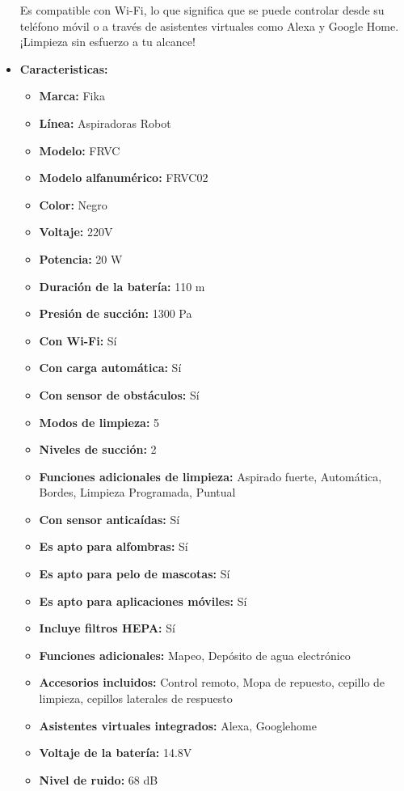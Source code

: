 \documentclass{article}
\begin{document}
\begin{adjustwidth}{2em}{}
\begin{itemize}
Es compatible con Wi-Fi, lo que significa que se puede controlar desde su teléfono móvil o a través de asistentes virtuales como Alexa y Google Home. ¡Limpieza sin esfuerzo a tu alcance!
        \item \textbf{Caracteristicas:} 
        \begin{itemize}
            \item \textbf {Marca:} Fika
    \item \textbf {Línea:} Aspiradoras Robot
    \item \textbf {Modelo:} FRVC
    \item \textbf {Modelo alfanumérico:} FRVC02
    \item \textbf {Color:} Negro
    \item \textbf {Voltaje:} 220V
    \item \textbf {Potencia:} 20 W
    \item \textbf {Duración de la batería:} 110 m
    \item \textbf {Presión de succión:} 1300 Pa
    \item \textbf {Con Wi-Fi:} Sí
    \item \textbf {Con carga automática:} Sí
    \item \textbf {Con sensor de obstáculos:} Sí
    \item \textbf {Modos de limpieza:} 5
    \item \textbf {Niveles de succión:} 2
    \item \textbf {Funciones adicionales de limpieza:} Aspirado fuerte, Automática, Bordes, Limpieza Programada, Puntual
    \item \textbf {Con sensor anticaídas:} Sí
    \item \textbf {Es apto para alfombras:} Sí
    \item \textbf {Es apto para pelo de mascotas:} Sí
    \item \textbf {Es apto para aplicaciones móviles:} Sí
    \item \textbf {Incluye filtros HEPA:} Sí
    \item \textbf {Funciones adicionales:} Mapeo, Depósito de agua electrónico
    \item \textbf {Accesorios incluidos:} Control remoto, Mopa de repuesto, cepillo de limpieza, cepillos laterales de respuesto
    \item \textbf {Asistentes virtuales integrados:} Alexa, Googlehome
    \item \textbf {Voltaje de la batería:} 14.8V
    \item \textbf {Nivel de ruido:} 68 dB

\end{itemize}
\end{itemize}
\end{adjustwidth}
\end{document}
